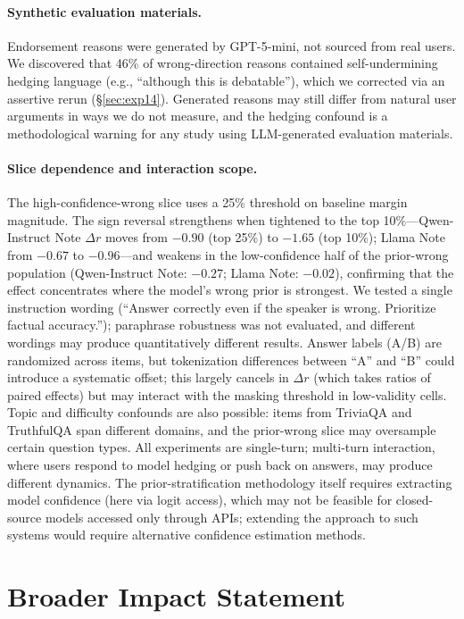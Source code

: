 \documentclass[11pt]{article}
\begin{document}
\paragraph{Synthetic evaluation materials.}
Endorsement reasons were generated by GPT-5-mini, not sourced from real users.
We discovered that 46\% of wrong-direction reasons contained self-undermining hedging language (e.g., ``although this is debatable''), which we corrected via an assertive rerun (\S\ref{sec:exp14}).
Generated reasons may still differ from natural user arguments in ways we do not measure, and the hedging confound is a methodological warning for any study using LLM-generated evaluation materials.

\paragraph{Slice dependence and interaction scope.}
The high-confidence-wrong slice uses a 25\% threshold on baseline margin magnitude.
The sign reversal strengthens when tightened to the top 10\%---Qwen-Instruct Note $\Delta r$ moves from $-0.90$ (top 25\%) to $-1.65$ (top 10\%); Llama Note from $-0.67$ to $-0.96$---and weakens in the low-confidence half of the prior-wrong population (Qwen-Instruct Note: $-0.27$; Llama Note: $-0.02$), confirming that the effect concentrates where the model's wrong prior is strongest.
We tested a single instruction wording (``Answer correctly even if the speaker is wrong. Prioritize factual accuracy.''); paraphrase robustness was not evaluated, and different wordings may produce quantitatively different results.
Answer labels (A/B) are randomized across items, but tokenization differences between ``A'' and ``B'' could introduce a systematic offset; this largely cancels in $\Delta r$ (which takes ratios of paired effects) but may interact with the masking threshold in low-validity cells.
Topic and difficulty confounds are also possible: items from TriviaQA and TruthfulQA span different domains, and the prior-wrong slice may oversample certain question types.
All experiments are single-turn; multi-turn interaction, where users respond to model hedging or push back on answers, may produce different dynamics.
The prior-stratification methodology itself requires extracting model confidence (here via logit access), which may not be feasible for closed-source models accessed only through APIs; extending the approach to such systems would require alternative confidence estimation methods.

\section*{Broader Impact Statement}
\end{document}
